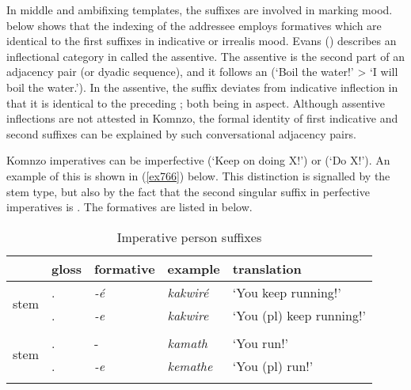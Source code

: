In middle and ambifixing templates, the  suffixes are involved in marking  mood.  below shows that the indexing of the addressee employs formatives which are identical to the first  suffixes in indicative or irrealis mood. Evans (\citeyear{Evans:2012ue}) describes an inflectional category in  called the assentive. The assentive is the second part of an adjacency pair (or dyadic sequence), and it follows an  (`Boil the water!' > `I will boil the water.'). In the assentive, the  suffix deviates from indicative inflection in that it is identical to the preceding ; both being  in  aspect. Although assentive inflections are not attested in Komnzo, the formal identity of first  indicative and second   suffixes can be explained by such conversational adjacency pairs.%

Komnzo imperatives can be imperfective (`Keep on doing X!') or  (`Do X!'). An example of this is shown in (\ref{ex766}) below. This distinction is signalled by the stem type, but also by the fact that the second singular suffix in perfective imperatives is . The formatives are listed in  below.

\begin{table}
\caption{Imperative person suffixes}
\label{perssuffimp}
	\begin{tabularx}{\textwidth}{XXXXl}
		\lsptoprule
		&{gloss} &{formative} &{example} &{translation}\\\midrule
		\multirow{2}{*}{\Ext{} stem} &\Ssg.\Imp &\emph{-é}	&\emph{kakwiré} &`You keep running!'\\
		&\Snsg.\Imp	&\emph{-e} &\emph{kakwire} &`You (pl) keep running!'\\
		&&&&\\
		\multirow{2}{*}{\Rs{} stem} &\Ssg.\Imp &-\Zero &\emph{kamath} &`You run!'\\
		&\Snsg.\Imp	&\emph{-e} &\emph{kemathe} &`You (pl) run!'\\
		\lspbottomrule
	\end{tabularx}
\end{table}%

